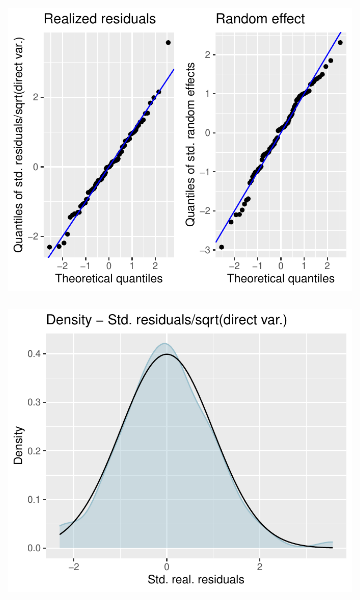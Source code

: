 \begin{figure}[h!]
	\begin{subfigure}{0.48\textwidth}
		\centering
		\includegraphics[width=1\linewidth]{./figures/plot1}
		\caption{}
		\label{fig:plota}
	\end{subfigure}
	\begin{subfigure}{0.48\textwidth}
		\centering
		\includegraphics[width=1\linewidth]{./figures/plot2}
		\caption{}
		\label{fig:plotb}
	\end{subfigure}
	\begin{subfigure}{0.48\textwidth}

\end{subfigure}
\end{figure}
